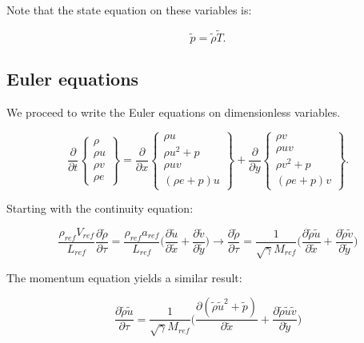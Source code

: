 \documentclass[10pt,a4paper]{article}
\begin{document}
Note that the state equation on these variables is:

\begin{equation}
\tilde{p} = \tilde{\rho}\tilde{T}.
\end{equation}

\subsection{Euler equations}

We proceed to write the Euler equations on dimensionless variables.

\begin{equation}
\frac{\partial}{\partial t}\left\{\begin{array}{c}\rho \\ \rho u \\ \rho v \\ \rho e \end{array}\right\} = \frac{\partial }{\partial x}\left\{\begin{array}{c} \rho u \\ \rho u^2 + p \\ \rho u v \\ (\rho e + p)u \end{array}\right\} +  \frac{\partial }{\partial y}\left\{\begin{array}{c} \rho v \\ \rho uv \\ \rho v^2 + p \\ (\rho e + p)v \end{array}\right\}.
\end{equation}

Starting with the continuity equation:

\begin{equation}
\frac{\rho_{ref} V_{ref}}{L_{ref}} \frac{\partial \tilde{\rho}}{\partial \tau} = \frac{\rho_{ref} a_{ref}}{L_{ref}}\biggl( \frac{\partial \tilde{u} }{\partial \tilde{x}}+\frac{\partial \tilde{v} }{\partial \tilde{y}}\biggr)	\rightarrow \frac{\partial \tilde{\rho}}{\partial \tau} = \frac{1}{\sqrt{\gamma}M_{ref}}\biggl( \frac{\partial \tilde{\rho}\tilde{u} }{\partial \tilde{x}}+\frac{\partial \tilde{\rho}\tilde{v} }{\partial \tilde{y}}\biggr)
\end{equation}

The momentum equation yields a similar result:

\begin{equation}
\frac{\partial \tilde{\rho}\tilde{u}}{\partial \tau} = \frac{1}{\sqrt{\gamma}M_{ref}}\biggl( \frac{\partial (\tilde{\rho}\tilde{u}^2 + \tilde{p}) }{\partial \tilde{x}}+\frac{\partial \tilde{\rho}\tilde{u}\tilde{v} }{\partial \tilde{y}}\biggr)
\end{equation}
\end{document}
